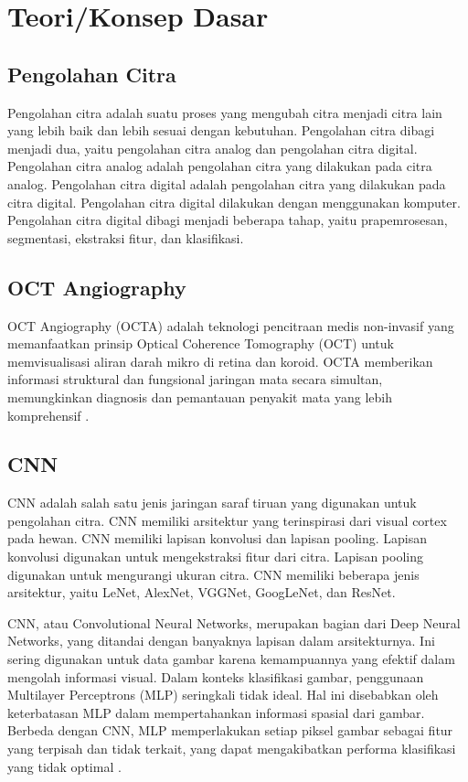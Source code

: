 \section{Teori/Konsep Dasar}
\label{sec:22}

\subsection{Pengolahan Citra}
\label{sec:221}

Pengolahan citra adalah suatu proses yang mengubah citra menjadi citra lain yang lebih baik dan lebih sesuai dengan kebutuhan. Pengolahan citra dibagi menjadi dua, yaitu pengolahan citra analog dan pengolahan citra digital. Pengolahan citra analog adalah pengolahan citra yang dilakukan pada citra analog. Pengolahan citra digital adalah pengolahan citra yang dilakukan pada citra digital. Pengolahan citra digital dilakukan dengan menggunakan komputer. Pengolahan citra digital dibagi menjadi beberapa tahap, yaitu prapemrosesan, segmentasi, ekstraksi fitur, dan klasifikasi.

\subsection{OCT Angiography}
\label{sec:222}

OCT Angiography (OCTA) adalah teknologi pencitraan medis non-invasif yang memanfaatkan prinsip Optical Coherence Tomography (OCT) untuk memvisualisasi aliran darah mikro di retina dan koroid. OCTA memberikan informasi struktural dan fungsional jaringan mata secara simultan, memungkinkan diagnosis dan pemantauan penyakit mata yang lebih komprehensif \parencite{Kashani2017-hn}.

\subsection{CNN}
\label{sec:223}

CNN adalah salah satu jenis jaringan saraf tiruan yang digunakan untuk pengolahan citra. CNN memiliki arsitektur yang terinspirasi dari visual cortex pada hewan. CNN memiliki lapisan konvolusi dan lapisan pooling. Lapisan konvolusi digunakan untuk mengekstraksi fitur dari citra. Lapisan pooling digunakan untuk mengurangi ukuran citra. CNN memiliki beberapa jenis arsitektur, yaitu LeNet, AlexNet, VGGNet, GoogLeNet, dan ResNet.

CNN, atau Convolutional Neural Networks, merupakan bagian dari Deep Neural Networks, yang ditandai dengan banyaknya lapisan dalam arsitekturnya. Ini sering digunakan untuk data gambar karena kemampuannya yang efektif dalam mengolah informasi visual. Dalam konteks klasifikasi gambar, penggunaan Multilayer Perceptrons (MLP) seringkali tidak ideal. Hal ini disebabkan oleh keterbatasan MLP dalam mempertahankan informasi spasial dari gambar. Berbeda dengan CNN, MLP memperlakukan setiap piksel gambar sebagai fitur yang terpisah dan tidak terkait, yang dapat mengakibatkan performa klasifikasi yang tidak optimal \parencite{AstutiSamsuryadi2018}.

